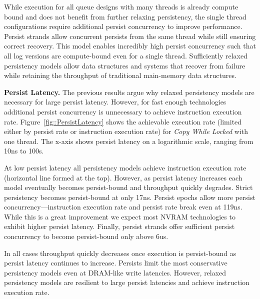 While execution for all queue designs with many threads is already compute bound and does not benefit from further relaxing persistency, the single thread configurations require additional persist concurrency to improve performance.
Persist strands allow concurrent persists from the same thread while still ensuring correct recovery.
This model enables incredibly high persist concurrency such that all log versions are compute-bound even for a single thread.
Sufficiently relaxed persistency models allow data structures and systems that recover from failure while retaining the throughput of traditional main-memory data structures.

\textbf{Persist Latency.}
The previous results argue why relaxed persistency models are necessary for large persist latency.
However, for fast enough technologies additional persist concurrency is unnecessary to achieve instruction execution rate.
Figure~\ref{fig::PersistLatency} shows the achievable execution rate (limited either by persist rate or instruction execution rate) for \emph{Copy While Locked} with one thread.
The x-axis shows persist latency on a logarithmic scale, ranging from 10ns to 100\textmu s.

%
 

At low persist latency all persistency models achieve instruction execution rate (horizontal line formed at the top).
However, as persist latency increases each model eventually becomes persist-bound and throughput quickly degrades.
Strict persistency becomes persist-bound at only 17ns.
Persist epochs allow more persist concurrency---instruction execution rate and persist rate break even at 119ns.
While this is a great improvement we expect most NVRAM technologies to exhibit higher persist latency.
Finally, persist strands offer sufficient persist concurrency to become persist-bound only above 6us.

In all cases throughput quickly decreases once execution is persist-bound as persist latency continues to increase.
Persists limit the most conservative persistency models even at DRAM-like write latencies.
However, relaxed persistency models are resilient to large persist latencies and achieve instruction execution rate.

